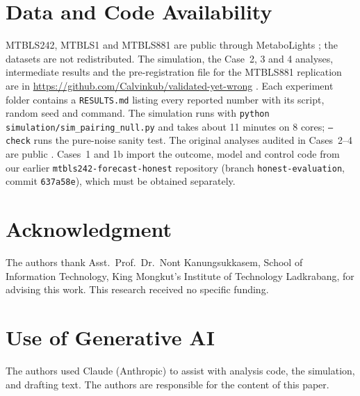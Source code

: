 \documentclass[conference]{IEEEtran}
\newif\ifshowtodos
\newcommand{\todo}[1]{\ifshowtodos\textcolor{red}{[TODO: #1]}\fi}
\begin{document}
\section*{Data and Code Availability}
MTBLS242, MTBLS1 and MTBLS881 are public through MetaboLights \cite{haug2020};
the datasets are not redistributed. The simulation, the Case~2, 3 and 4
analyses, intermediate results and the pre-registration file for the MTBLS881
replication are in \url{https://github.com/Calvinkub/validated-yet-wrong}
\todo{tag: \texttt{paper-v1} points to the \texttt{main} branch; create a
new tag on the final commit of \texttt{fixpaper-revisions} and cite it here
and in the first-page footnote}. Each experiment folder
contains a \texttt{RESULTS.md} listing every reported number with its script,
random seed and command. The simulation runs with
\texttt{python simulation/sim\_pairing\_null.py} and takes about 11 minutes on
8 cores; \texttt{--check} runs the pure-noise sanity test. The original
analyses audited in Cases~2--4 are public \cite{bridge2026, roar2026}. Cases~1
and 1b import the outcome, model and control code from our earlier
\texttt{mtbls242-forecast-honest} repository \cite{honest2026} (branch
\texttt{honest-evaluation}, commit \texttt{637a58e}), which must be obtained
separately.

\section*{Acknowledgment}
The authors thank Asst.\ Prof.\ Dr.\ Nont Kanungsukkasem, School of
Information Technology, King Mongkut's Institute of Technology Ladkrabang, for
advising this work. This research received no specific funding.

\section*{Use of Generative AI}
The authors used Claude (Anthropic) to assist with analysis code, the
simulation, and drafting text. The authors are responsible for the content
of this paper.
\end{document}
